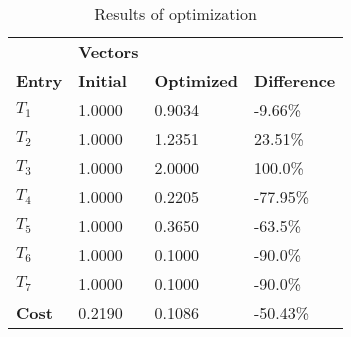 \begin{table}[H]
\centering
\begin{tabular}{llll}
\textbf{}      & \cellcolor[HTML]{EFEFEF}\textbf{Vectors} & \textbf{} & \textbf{}         \\
\rowcolor[HTML]{EFEFEF} 
\textbf{Entry} & \textbf{Initial} & \textbf{Optimized} & \textbf{Difference} \\
$T_1$ & 1.0000 & 0.9034 & -9.66\% \\ 
$T_2$ & 1.0000 & 1.2351 & 23.51\% \\ 
$T_3$ & 1.0000 & 2.0000 & 100.0\% \\ 
$T_4$ & 1.0000 & 0.2205 & -77.95\% \\ 
$T_5$ & 1.0000 & 0.3650 & -63.5\% \\ 
$T_6$ & 1.0000 & 0.1000 & -90.0\% \\ 
$T_7$ & 1.0000 & 0.1000 & -90.0\% \\ 
\rowcolor[HTML]{EFEFEF} 
\textbf{Cost}  & 0.2190 & 0.1086 & -50.43\% \\ 
\end{tabular}
\caption{Results of optimization}
\label{tab:OptimizationAnalysis}
\end{table}